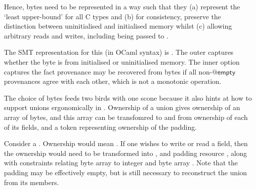 Hence, bytes need to be represented in a way such that they (a) represent the
`least upper-bound' for all C types and (b) for consistency, preserve the
distinction between uninitialised and initialised memory whilst (c) allowing
arbitrary reads and writes, including being passed to .

The SMT representation for this (in OCaml syntax) is
. The outer
 captures whether the byte is from initialised or
uninitialised memory. The inner option captures the fact provenance may be
recovered from bytes if all non-$@\mathsf{empty}$ provenances agree with each
other, which is not a monotonic operation.

The choice of bytes feeds two birds with one scone because it also hints at how
to support unions ergonomically in . Ownership of a union gives
ownership of an array of bytes, and this array can be transfomred to and from
ownership of each of its fields, and a token representing ownership of the
padding.

Consider a .
Ownership  would mean . If one wishes to write or read a field, then the ownership would need to
be transformed into , and %
padding resource , along with %
constraints relating byte array  to integer  and byte
array . Note that the padding may be effectively empty, but is
still necessary to reconstruct the union from its members.


